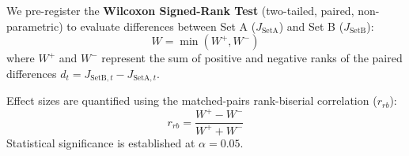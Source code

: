 We pre-register the \textbf{Wilcoxon Signed-Rank Test} (two-tailed, paired, non-parametric) to evaluate differences between Set A ($J_{\text{SetA}}$) and Set B ($J_{\text{SetB}}$):
\begin{equation}
    W = \min(W^+, W^-)
\end{equation}
where $W^+$ and $W^-$ represent the sum of positive and negative ranks of the paired differences $d_t = J_{\text{SetB}, t} - J_{\text{SetA}, t}$. 

Effect sizes are quantified using the matched-pairs rank-biserial correlation ($r_{rb}$):
\begin{equation}
    r_{rb} = \frac{W^+ - W^-}{W^+ + W^-}
\end{equation}
Statistical significance is established at $\alpha = 0.05$.
